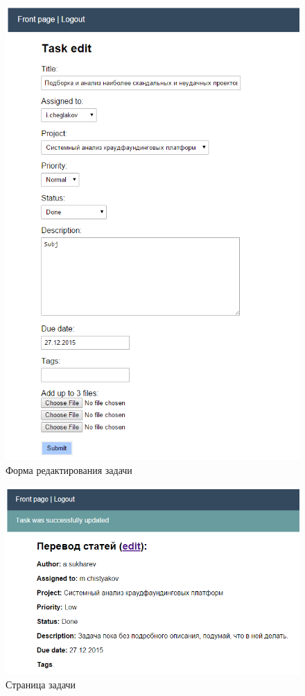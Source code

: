 \documentclass[a4paper, 14pt]{extarticle}
\begin{document}
\begin{figure}[!htb]
  \centering
    \includegraphics[scale=0.6]{../shared_images/frontend/task-edit.png}
   \caption{Форма редактирования задачи}
    \label{fig:start}
\end{figure}

\begin{figure}[!htb]
  \centering
    \includegraphics[scale=0.6]{../shared_images/frontend/task-view.png}
   \caption{Страница задачи}
    \label{fig:start}
\end{figure}
\end{document}
